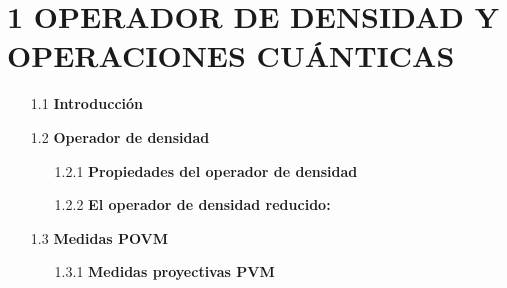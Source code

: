 \documentclass[12pt,oneside]{book}\raggedbottom{} %
\begin{document}
\begin{sloppypar}
{{\section*{1 OPERADOR DE DENSIDAD Y OPERACIONES CUÁNTICAS}
\begin{itemize}
\item[1.1]\textbf{Introducción}




\item[1.2] \textbf{Operador de densidad}

\begin{itemize}
  \item[1.2.1] \textbf{Propiedades del operador de densidad} 
  
  \item[1.2.2] \textbf{El operador de densidad reducido:} 
  

\end{itemize}
\item[1.3] \textbf{Medidas POVM} 
\begin{itemize}
  \item[1.3.1]\textbf{Medidas proyectivas PVM}
  

\end{itemize}
\end{itemize}}}
\end{sloppypar}
\end{document}
